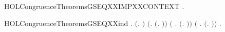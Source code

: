 \begin{SaveVerbatim}{HOLCongruenceTheoremsGSEQXXIMPXXCONTEXT}
\HOLTokenTurnstile{} \HOLSymConst{\HOLTokenForall{}}.   \HOLSymConst{\HOLTokenImp{}}  
\end{SaveVerbatim}
\newcommand{\HOLCongruenceTheoremsGSEQXXIMPXXCONTEXT}{\UseVerbatim{HOLCongruenceTheoremsGSEQXXIMPXXCONTEXT}}
\begin{SaveVerbatim}{HOLCongruenceTheoremsGSEQXXind}
\HOLTokenTurnstile{} \HOLSymConst{\HOLTokenForall{}}.
        \ensuremath{(}\HOLTokenLambda{}. \ensuremath{)} \HOLSymConst{\HOLTokenConj{}} \ensuremath{(}\HOLSymConst{\HOLTokenForall{}}.  \ensuremath{(}\HOLTokenLambda{}. \ensuremath{)}\ensuremath{)} \HOLSymConst{\HOLTokenConj{}}
       \ensuremath{(}\HOLSymConst{\HOLTokenForall{}} .   \HOLSymConst{\HOLTokenImp{}}  \ensuremath{(}\HOLTokenLambda{}. \HOLSymConst{\ensuremath{\ldotp}} \ensuremath{)}\ensuremath{)} \HOLSymConst{\HOLTokenConj{}}
       \ensuremath{(}\HOLSymConst{\HOLTokenForall{}}   .
              \HOLSymConst{\HOLTokenConj{}}   \HOLSymConst{\HOLTokenImp{}}  \ensuremath{(}\HOLTokenLambda{}. \HOLSymConst{\ensuremath{\ldotp}}  \HOLSymConst{\ensuremath{+}} \HOLSymConst{\ensuremath{\ldotp}} \ensuremath{)}\ensuremath{)} \HOLSymConst{\HOLTokenImp{}}
       \HOLSymConst{\HOLTokenForall{}}.   \HOLSymConst{\HOLTokenImp{}}  
\end{SaveVerbatim}
\newcommand{\HOLCongruenceTheoremsGSEQXXind}{\UseVerbatim{HOLCongruenceTheoremsGSEQXXind}}
